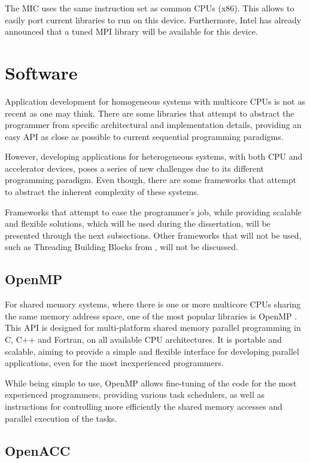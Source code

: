 The MIC uses the same instruction set as common \intel CPUs (x86). This allows to easily port current libraries to run on this device. Furthermore, Intel has already announced that a tuned MPI library will be available for this device.

\section{Software}

Application development for homogeneous systems with multicore CPUs is not as recent as one may think. There are some libraries that attempt to abstract the programmer from specific architectural and implementation details, providing an easy API as close as possible to current sequential programming paradigms.

However, developing applications for heterogeneous systems, with both CPU and accelerator devices, poses a series of new challenges due to its different programming paradigm. Even though, there are some frameworks that attempt to abstract the inherent complexity of these systems.

Frameworks that attempt to ease the programmer’s job, while providing scalable and flexible solutions, which will be used during the dissertation, will be presented through the next subsections. Other frameworks that will not be used, such as Threading Building Blocks from \intel \cite{Intel:TBB}, will not be discussed.

\subsection{OpenMP}

For shared memory systems, where there is one or more multicore CPUs sharing the same memory address space, one of the most popular libraries is OpenMP \cite{OpenMP}. This API is designed for multi-platform shared memory parallel programming in C, C++ and Fortran, on all available CPU architectures. It is portable and scalable, aiming to provide a simple and flexible interface for developing parallel applications, even for the most inexperienced programmers.

While being simple to use, OpenMP allows fine-tuning of the code for the most experienced programmers, providing various task schedulers, as well as instructions for controlling more efficiently the shared memory accesses and parallel execution of the tasks.

\subsection{OpenACC}

